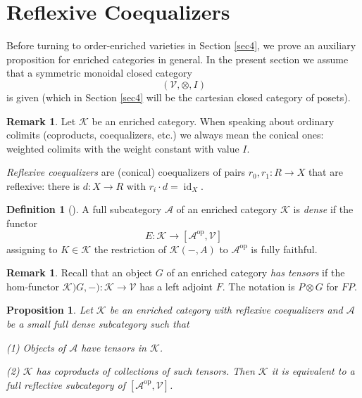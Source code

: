 \documentclass[12pt,amstex,leqno]{amsart}
\newcommand\op{\operatorname{op}}
\newcommand{\id}{\operatorname{id}}
\newcommand\ck{\mathcal {K}}
\newcommand\ca{\mathcal {A}}
\newcommand\cv{\mathcal {V}}
\newtheorem{prop}[theorem]{Proposition}
\theoremstyle{definition}
\newtheorem{defi}[theorem]{Definition}
\newtheorem{remark}[theorem]{Remark}
\numberwithin{equation}{section}
\begin{document}
\section{Reflexive Coequalizers}\label{sec3}

Before turning to order-enriched varieties in Section \ref{sec4}, we prove an auxiliary proposition for enriched categories in general.  In the present section we assume that a symmetric monoidal closed category
$$
(\cv, \otimes, I)
$$
is given (which in Section \ref{sec4} will be the cartesian closed category of posets).

\begin{remark}\label{re3.1}
Let $\ck$ be an enriched category. When speaking about ordinary colimits (coproducts, coequalizers, etc.) we always mean the conical ones: weighted colimits with the weight constant with value $I$.

\emph{Reflexive coequalizers} are (conical) coequalizers of pairs $r_0, r_1\colon R\to X$ that are reflexive: there is $d\colon X\to R$ with $r_i\cdot d= \id_X$.
\end{remark}

\begin{defi}[{\cite{K}}] %
A full subcategory $\ca$ of an enriched category $\ck$ is \emph{dense} if the functor
$$
E\colon \ck \to [\ca^{\op}, \cv]
$$
assigning to $K\in \ck$ the restriction of $\ck(-, A)$ to $\ca^{\op}$ is fully faithful.
\end{defi}

\begin{remark}\label{R:ten}
 Recall that an object $G$ of an enriched category  \emph{has tensors} if the hom-functor $\ck)G, -) \colon \ck \to \cv$ has a  left adjoint $F$.  The notation is $P\otimes G$ for $FP$.
 \end{remark}
 
\begin{prop}\label{P:refl} 
Let $\ck$ be an enriched category with reflexive coequalizers and $\ca$ be a small full dense subcategory such that

(1) Objects of $\ca$ have tensors  in $\ck$. 

(2) $\ck$ has coproducts of collections of such tensors.
Then $\ck$ it is equivalent to a full reflective subcategory of $[\ca^{\op}, \cv]$.
\end{prop}
\end{document}
